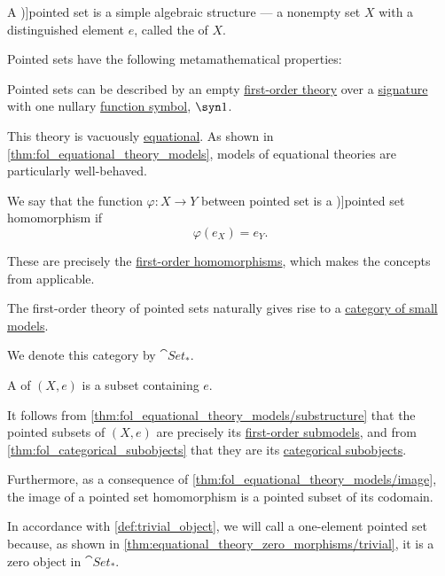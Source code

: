 \begin{definition}\label{def:pointed_set}
  A \term[ru=множество с отмеченной точкой (\cite[16]{ЦаленкоШульгейфер1974ОсновыТеорииКатегорий})]{pointed set} is a simple algebraic structure --- a nonempty set \( X \) with a distinguished element \( e \), called the  of \( X \).

  Pointed sets have the following metamathematical properties:
  \begin{thmenum}
    \mimprovised Pointed sets can be described by an empty \hyperref[def:fol_theory]{first-order theory} over a \hyperref[def:fol_signature]{signature} with one nullary \hyperref[def:fol_signature/function]{function symbol}, \( \syn1 \).

    This theory is vacuously \hyperref[def:fol_equational_theory]{equational}. As shown in \cref{thm:fol_equational_theory_models}, models of equational theories are particularly well-behaved.

     We say that the function \( \varphi: X \to Y \) between pointed set is a \term[en=map (between pointed sets) (\cite[26]{MacLane1998CategoryTheory})]{pointed set homomorphism} if
    \begin{equation}\label{eq:def:pointed_set/morphism}
      \varphi(e_X) = e_Y.
    \end{equation}

    These are precisely the \hyperref[def:fol_homomorphism]{first-order homomorphisms}, which makes the concepts from  applicable.

     The first-order theory of pointed sets naturally gives rise to a \hyperref[def:fol_theory_model_functor/obj]{category of small models}.

    We denote this category by \( \cat{Set}_* \).

    \mimprovised A  of \( (X, e) \) is a subset containing \( e \).

    It follows from \cref{thm:fol_equational_theory_models/substructure} that the pointed subsets of \( (X, e) \) are precisely its \hyperref[def:fol_substructure/submodel]{first-order submodels}, and from \cref{thm:fol_categorical_subobjects} that they are its \hyperref[def:categorical_subobject]{categorical subobjects}.

    Furthermore, as a consequence of \cref{thm:fol_equational_theory_models/image}, the image of a pointed set homomorphism is a pointed subset of its codomain.

    \mimprovised In accordance with \cref{def:trivial_object}, we will call a one-element pointed set  because, as shown in \cref{thm:equational_theory_zero_morphisms/trivial}, it is a zero object in \( \cat{Set}_* \).
  \end{thmenum}
\end{definition}

